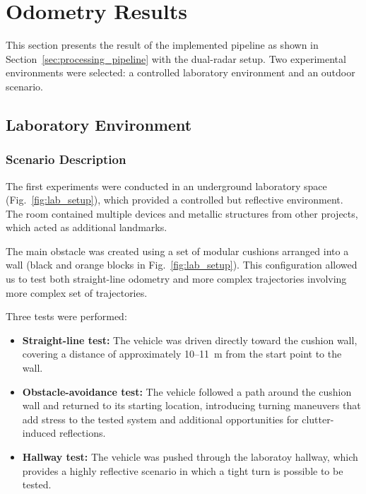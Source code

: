 \newpage
\section{Odometry Results}
\label{sec:odometry_results}

This section presents the result of the implemented pipeline as shown in Section~\ref{sec:processing_pipeline} with the dual-radar setup.
Two experimental environments were selected: a controlled laboratory environment and an outdoor scenario. 

\subsection{Laboratory Environment}
\subsubsection{Scenario Description}

The first experiments were conducted in an underground laboratory space (Fig.~\ref{fig:lab_setup}), which provided a controlled but reflective environment.  
The room contained multiple devices and metallic structures from other projects, which acted as additional landmarks.  

The main obstacle was created using a set of modular cushions arranged into a wall (black and orange blocks in Fig.~\ref{fig:lab_setup}).  
This configuration allowed us to test both straight-line odometry and more complex trajectories involving more complex set of trajectories.  

Three tests were performed:
\begin{itemize}
    \item \textbf{Straight-line test:} The vehicle was driven directly toward the cushion wall, covering a distance of approximately 10--11~m from the start point to the wall.  
    \item \textbf{Obstacle-avoidance test:} The vehicle followed a path around the cushion wall and returned to its starting location, introducing turning maneuvers that add stress to the tested system and additional opportunities for clutter-induced reflections. 
    \item \textbf{Hallway test:} The vehicle was pushed through the laboratoy hallway, which provides a highly reflective scenario in which a tight turn is possible to be tested.
\end{itemize}

